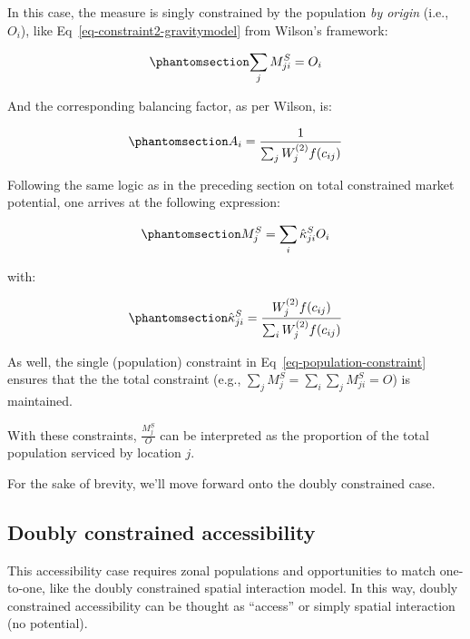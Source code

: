 \documentclass[
  10pt,
  letterpaper,
]{article}
\begin{document}
In this case, the measure is singly constrained by the population
\emph{by origin} (i.e., \(O_i\)), like
Eq~\ref{eq-constraint2-gravitymodel} from Wilson's framework:

\begin{equation}\phantomsection\label{eq-population-constraint}{
\sum_j M^S_{ji} =  O_i 
}\end{equation}

And the corresponding balancing factor, as per Wilson, is:

\begin{equation}\phantomsection\label{eq-population-constrained-proportionality-constants}{
A_i = \frac{1}{\sum_j W_j^{(2)} f(c_{ij})}
}\end{equation}

Following the same logic as in the preceding section on total
constrained market potential, one arrives at the following expression:

\begin{equation}\phantomsection\label{eq-production-constrained-accessibility-with-proportional-allocation-factor}{
M^S_{j} = \sum_i \hat \kappa^S_{ji} O_i
}\end{equation}

\noindent with:

\begin{equation}\phantomsection\label{eq-attraction-constrained-proportional-allocation-factor}{
\hat \kappa^S_{ji} = \frac{W_j^{(2)} f(c_{ij})}{\sum_i W_j^{(2)} f(c_{ij})}
}\end{equation}

As well, the single (population) constraint in
Eq~\ref{eq-population-constraint} ensures that the the total constraint
(e.g., \(\sum_j M^S_{j} = \sum_i\sum_j  M^S_{ji} = O\)) is maintained.

With these constraints, \(\frac{M_j^S}{O}\) can be interpreted as the
proportion of the total population serviced by location \(j\).

For the sake of brevity, we'll move forward onto the doubly constrained
case.

\subsection{Doubly constrained
accessibility}\label{doubly-constrained-accessibility}

This accessibility case requires zonal populations and opportunities to
match one-to-one, like the doubly constrained spatial interaction model.
In this way, doubly constrained accessibility can be thought as
``access'' or simply spatial interaction (no potential).
\end{document}
